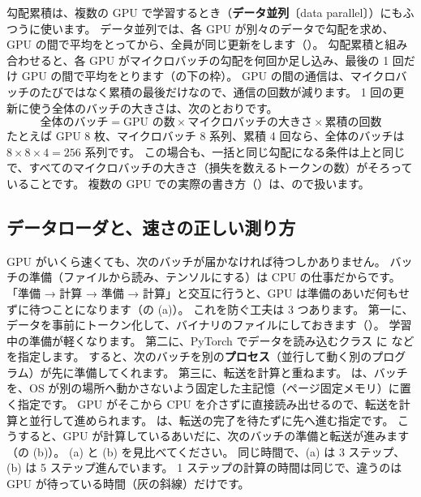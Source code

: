 勾配累積は、複数の GPU で学習するとき（\textbf{データ並列}〔data parallel〕）にもふつうに使います。
データ並列では、各 GPU が別々のデータで勾配を求め、GPU の間で平均をとってから、全員が同じ更新をします（）。
勾配累積と組み合わせると、各 GPU がマイクロバッチの勾配を何回か足し込み、最後の 1 回だけ GPU の間で平均をとります（の下の枠）。
GPU の間の通信は、マイクロバッチのたびではなく累積の最後だけなので、通信の回数が減ります。
1 回の更新に使う全体のバッチの大きさは、次のとおりです。
\begin{equation}
  \text{全体のバッチ} = \text{GPU の数}\times\text{マイクロバッチの大きさ}\times\text{累積の回数}
  \label{eq:gpu-global-batch}
\end{equation}
たとえば GPU 8 枚、マイクロバッチ 8 系列、累積 4 回なら、全体のバッチは $8\times8\times4=256$ 系列です。
この場合も、一括と同じ勾配になる条件は上と同じで、すべてのマイクロバッチの大きさ（損失を数えるトークンの数）がそろっていることです。
複数の GPU での実際の書き方（）は、ので扱います。

\subsection*{データローダと、速さの正しい測り方}

GPU がいくら速くても、次のバッチが届かなければ待つしかありません。
バッチの準備（ファイルから読み、テンソルにする）は CPU の仕事だからです。
「準備 → 計算 → 準備 → 計算」と交互に行うと、GPU は準備のあいだ何もせずに待つことになります（の (a)）。
これを防ぐ工夫は 3 つあります。
第一に、データを事前にトークン化して、バイナリのファイルにしておきます（）。
学習中の準備が軽くなります。
第二に、PyTorch でデータを読み込むクラス  に  などを指定します。
すると、次のバッチを別の\textbf{プロセス}（並行して動く別のプログラム）が先に準備してくれます。
第三に、転送を計算と重ねます。
 は、バッチを、OS が別の場所へ動かさないよう固定した主記憶（ページ固定メモリ）に置く指定です。
GPU がそこから CPU を介さずに直接読み出せるので、転送を計算と並行して進められます。
 は、転送の完了を待たずに先へ進む指定です。
こうすると、GPU が計算しているあいだに、次のバッチの準備と転送が進みます（の (b)）。
(a) と (b) を見比べてください。
同じ時間で、(a) は 3 ステップ、(b) は 5 ステップ進んでいます。
1 ステップの計算の時間は同じで、違うのは GPU が待っている時間（灰の斜線）だけです。

